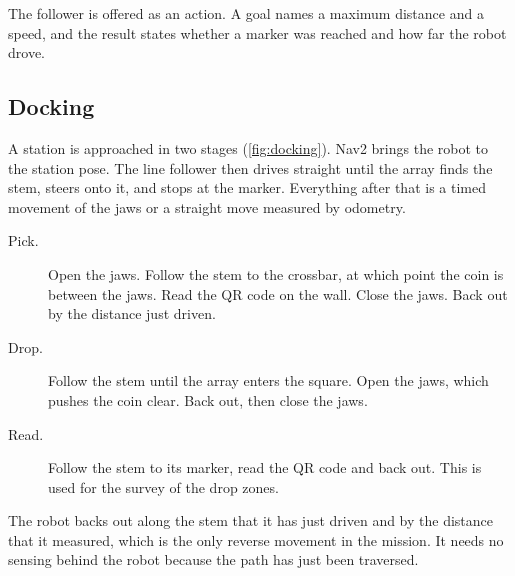 The follower is offered as an action. A goal names a maximum distance and a speed, and the
result states whether a marker was reached and how far the robot drove.

\subsection{Docking}
\label{sec:docking}
A station is approached in two stages (\cref{fig:docking}). Nav2 brings the robot to the
station pose. The line follower then drives straight until the array finds the stem, steers
onto it, and stops at the marker. Everything after that is a timed movement of the jaws or
a straight move measured by odometry.

\begin{description}
  \item[Pick.] Open the jaws. Follow the stem to the crossbar, at which point the coin is
        between the jaws. Read the QR code on the wall. Close the jaws. Back out by the
        distance just driven.
  \item[Drop.] Follow the stem until the array enters the square. Open the jaws, which
        pushes the coin clear. Back out, then close the jaws.
  \item[Read.] Follow the stem to its marker, read the QR code and back out. This is used
        for the survey of the drop zones.
\end{description}
The robot backs out along the stem that it has just driven and by the distance that it
measured, which is the only reverse movement in the mission. It needs no sensing behind the
robot because the path has just been traversed.

